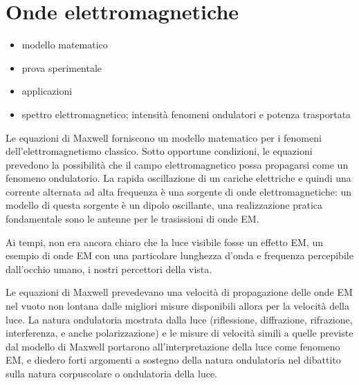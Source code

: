 \documentclass[letterpaper,10pt,italian]{jupyterBook}
\begin{document}
\sphinxstepscope


\chapter{Onde elettromagnetiche}
\label{\detokenize{ch/electromagnetism/em-waves:onde-elettromagnetiche}}\label{\detokenize{ch/electromagnetism/em-waves:physics-hs-electromagnetism-em-waves}}\label{\detokenize{ch/electromagnetism/em-waves::doc}}\begin{itemize}
\item {} 
\sphinxAtStartPar
modello matematico

\item {} 
\sphinxAtStartPar
prova sperimentale

\item {} 
\sphinxAtStartPar
applicazioni

\item {} 
\sphinxAtStartPar
spettro elettromagnetico; intensità fenomeni ondulatori e potenza trasportata

\end{itemize}

\sphinxAtStartPar
{} Le equazioni di Maxwell forniscono un modello matematico per i fenomeni dell’elettromagnetismo classico. Sotto opportune condizioni, le equazioni prevedono la possibilità che il campo elettromagnetico possa propagarsi come un fenomeno ondulatorio. La rapida oscillazione di un cariche elettriche \sphinxhyphen{} e quindi una corrente alternata ad alta frequenza \sphinxhyphen{} è una sorgente di onde elettromagnetiche: un modello di questa sorgente è un dipolo oscillante, una realizzazione pratica fondamentale sono le antenne per le trasissioni di onde EM.

\sphinxAtStartPar
Ai tempi, non era ancora chiaro che la luce visibile fosse un effetto EM, un esempio di onde EM con una particolare lunghezza d’onda e frequenza percepibile dall’occhio umano, i nostri percettori della vista.

\sphinxAtStartPar
Le equazioni di Maxwell prevedevano una velocità di propagazione delle onde EM nel vuoto non lontana dalle migliori misure disponibili allora per la velocità della luce. La natura ondulatoria mostrata dalla luce (riflessione, diffrazione, rifrazione, interferenza, e anche polarizzazione) e le misure di velocità simili a quelle previste dal modello di Maxwell portarono all’interpretazione della luce come fenomeno EM, e diedero forti argomenti a sostegno della natura ondulatoria nel dibattito sulla natura corpuscolare o ondulatoria della luce.
\end{document}
